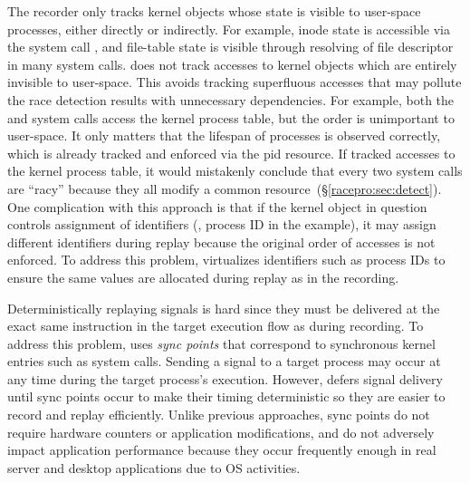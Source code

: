 The recorder only tracks kernel objects whose state is visible
to user-space processes, either directly or indirectly.  For example,
inode state is accessible via the system call , and
file-table state is visible through resolving of file descriptor in
many system calls. \racepro does not track accesses to kernel
objects which are entirely invisible to user-space.
This avoids tracking superfluous
accesses that may pollute the race detection results with unnecessary
dependencies.
For example, both the  and  system calls access the
kernel process table, but the order is unimportant to user-space. It
only matters that the lifespan of processes is observed correctly, 
which is already tracked and enforced via the pid resource.  If \racepro
tracked accesses to the kernel process table, it would mistakenly
conclude that every two  system calls are ``racy'' because they
all modify a common resource~(\S\ref{racepro:sec:detect}).  One complication 
with this approach is that if the kernel object in question controls
assignment of identifiers (\eg, process ID in the  example),
it may assign different identifiers during replay because the original
order of accesses is not enforced. To address this problem, \racepro
virtualizes identifiers such as process IDs to ensure the same values
are allocated during replay as in the recording.

Deterministically replaying signals is hard since they must be
delivered at the exact same instruction in the target execution flow
as during recording.  To address this problem,
\racepro uses \emph{sync points} that correspond to synchronous kernel entries
such as system calls.  Sending 
a signal to a target process may occur at any time during the target
process's execution.  However, \racepro defers signal delivery until sync
points occur to make their timing deterministic so they are easier to
record and replay efficiently.  Unlike previous approaches, sync
points do not require hardware counters or application modifications,
and do not adversely impact application performance because they occur
frequently enough in real server and desktop applications due to OS
activities.  

